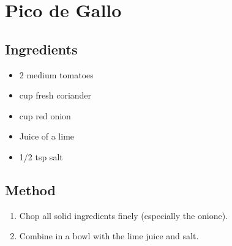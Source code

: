 \clearpage
\section{Pico de Gallo}
  \begin{multicols}{2}
    \subsection{Ingredients}
      \begin{itemize}
        \item 2 medium tomatoes
        \item {} cup fresh coriander
        \item {} cup red onion
        \item Juice of  a lime
        \item 1/2 tsp salt
      \end{itemize}
  \vfill\null
  \columnbreak
  \subsection{Method}
    \begin{enumerate}
      \item Chop all solid ingredients finely (especially the onione).
      \item Combine in a bowl with the lime juice and salt.
    \end{enumerate}
  \end{multicols}
